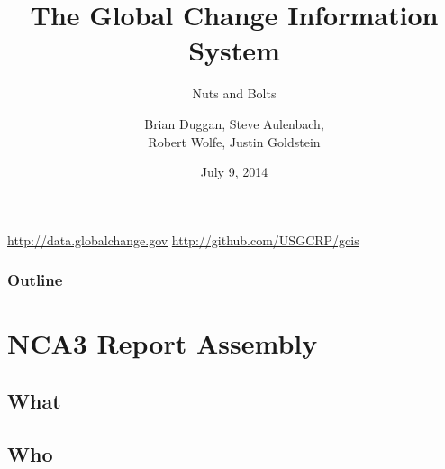 \documentclass{beamer}
\begin{document}
\title{The Global Change Information System}   
\subtitle{Nuts and Bolts}
\author{Brian Duggan, Steve Aulenbach, \\
Robert Wolfe, Justin Goldstein} 
\date{July 9, 2014} 

\begin{frame}[plain]
\titlepage
\begin{center}
\url{http://data.globalchange.gov}
\url{http://github.com/USGCRP/gcis}
\end{center}
\end{frame}

\begin{frame}[plain]
\frametitle{Outline}\tableofcontents 
\end{frame}

\section{NCA3 Report Assembly}



\subsection{What}

\subsection{Who}
\end{document}
